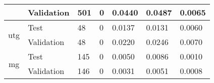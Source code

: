 \begin{table}[H]
\begin{tabular}{|c|l|l|llll|}
                                           & Validation                                             & 501                                              & \multicolumn{1}{l|}{0}                  & \multicolumn{1}{l|}{0.0440}               & \multicolumn{1}{l|}{0.0487}               & 0.0065               \\ \hline
\multirow{2}{*}{utg}                       & Test                                                   & 48                                               & \multicolumn{1}{l|}{0}                  & \multicolumn{1}{l|}{0.0137}               & \multicolumn{1}{l|}{0.0131}               & 0.0060               \\ \cline{2-7} 
                                           & Validation                                             & 48                                               & \multicolumn{1}{l|}{0}                  & \multicolumn{1}{l|}{0.0220}               & \multicolumn{1}{l|}{0.0246}               & 0.0070               \\ \hline
\multirow{2}{*}{mg}                        & Test                                                   & 145                                              & \multicolumn{1}{l|}{0}                  & \multicolumn{1}{l|}{0.0050}               & \multicolumn{1}{l|}{0.0086}               & 0.0010               \\ \cline{2-7} 
                                           & Validation                                             & 146                                              & \multicolumn{1}{l|}{0}                  & \multicolumn{1}{l|}{0.0031}               & \multicolumn{1}{l|}{0.0051}               & 0.0008               \\ \hline
\end{tabular}
\label{tab:CodeMitigationStdDev}
\end{table}